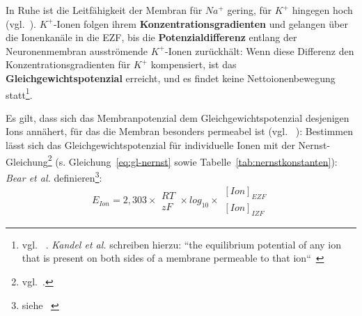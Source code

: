 In Ruhe ist die Leitfähigkeit der Membran für $Na^+$ gering, für $K^+$ hingegen hoch (vgl.~\cite[44]{SD07}).
$K^+$-Ionen folgen ihrem \textbf{Konzentrationsgradienten} und gelangen über die Ionenkanäle in die EZF, bis die \textbf{Potenzialdifferenz} entlang der Neuronenmembran ausströmende $K^+$-Ionen zurückhält: Wenn diese Differenz den Konzentrationsgradienten für $K^+$ kompensiert, ist das \textbf{Gleichgewichtspotenzial} erreicht, und es findet keine Nettoionenbewegung statt\footnote{
 vgl. ~\cite[72]{BCP18}. \textit{Kandel et al.} schreiben hierzu:
 ``the equilibrium potential of any ion that is present on both sides of a membrane permeable to that ion``~\cite[130]{KSJ+13}
}.

Es gilt, dass sich das Membranpotenzial dem Gleichgewichtspotenzial desjenigen Ions annähert, für das die Membran besonders permeabel ist (vgl. ~\cite[145 f.]{KSJ+13}): Bestimmen lässt sich das Gleichgewichtspotenzial für individuelle Ionen mit der Nernst-Gleichung\footnote{
 vgl.~\cite[67]{FE19}.
} (s. Gleichung~\ref{eq:gl-nernst} sowie Tabelle~\ref{tab:nernstkonstanten}):\\

\textit{Bear et al.} definieren\footnote{siehe ~\cite[74, Exkurs 3.2]{BCP18}}:
\begin{equation}
E_{Ion} = 2,303  \times \begin{matrix} RT \\ \hline zF \end{matrix} \times log_{10} \times \begin{matrix} [Ion]_{EZF} \\ \hline [Ion]_{IZF} \end{matrix}
\label{eq:gl-nernst}
\end{equation}



